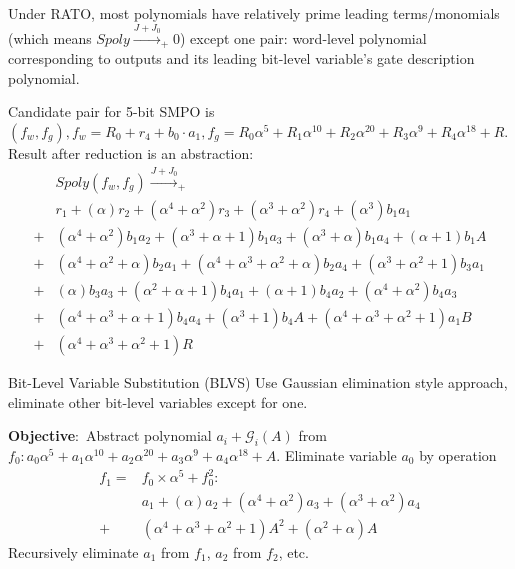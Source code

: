 \documentclass[xcolor=dvipsnames]{beamer}
\begin{document}
\begin{frame}
Under RATO, most polynomials
have relatively prime leading terms/monomials (which means $Spoly \xrightarrow{J+J_0}_{+} 0$) except one pair:
word-level polynomial corresponding to outputs and its leading bit-level variable's gate description polynomial.
\begin{Example}
Candidate pair for 5-bit SMPO is
$(f_w,f_g), f_w = R_0+r_4+b_0\cdot a_1, f_g =R_0\alpha^5+R_1\alpha^{10}+R_2\alpha^{20}+R_3\alpha^9+R_4\alpha^{18} + R$.
Result after reduction is an abstraction:
\begin{align}
&Spoly(f_w,f_g) \xrightarrow{J+J_0}_{+}\nonumber\\
&r_1+(\alpha)r_2+(\alpha^4+\alpha^2)r_3+(\alpha^3+\alpha^2)r_4+(\alpha^3)b_1a_1\nonumber\\
+&(\alpha^4+\alpha^2)b_1a_2+(\alpha^3+\alpha+1)b_1a_3+(\alpha^3+\alpha)b_1a_4+(\alpha+1)b_1A\nonumber\\
+&(\alpha^4+\alpha^2+\alpha)b_2a_1+(\alpha^4+\alpha^3+\alpha^2+\alpha)b_2a_4+(\alpha^3+\alpha^2+1)b_3a_1\nonumber\\
+&(\alpha)b_3a_3+(\alpha^2+\alpha+1)b_4a_1+(\alpha+1)b_4a_2+(\alpha^4+\alpha^2)b_4a_3\nonumber\\
+&(\alpha^4+\alpha^3+\alpha+1)b_4a_4+(\alpha^3+1)b_4A+(\alpha^4+\alpha^3+\alpha^2+1)a_1B\nonumber\\
+&(\alpha^4+\alpha^3+\alpha^2+1)R\nonumber
\end{align}
\end{Example}
\end{frame}

\begin{frame}{\large{Bit-Level Variable Substitution (BLVS)}}
Use Gaussian elimination style approach, eliminate other bit-level variables except for one.
\begin{Example}
{\bf Objective}:\ Abstract polynomial $a_i + \mathcal{G}_i(A)$ from $f_0: a_0\alpha^5+a_1\alpha^{10}+a_2\alpha^{20}+a_3\alpha^9+a_4\alpha^{18}+A$.
Eliminate variable $a_0$ by operation 
\begin{align}
f_1 =& f_0\times \alpha^5 + f_0^2: \nonumber\\
&a_1+(\alpha)a_2+(\alpha^4+\alpha^2)a_3+(\alpha^3+\alpha^2)a_4\nonumber\\
+&(\alpha^4+\alpha^3+\alpha^2+1)A^2+(\alpha^2+\alpha)A\nonumber
\end{align}
Recursively eliminate $a_1$ from $f_1$, $a_2$ from $f_2$, etc. 
\end{Example}
\end{frame}
\end{document}
